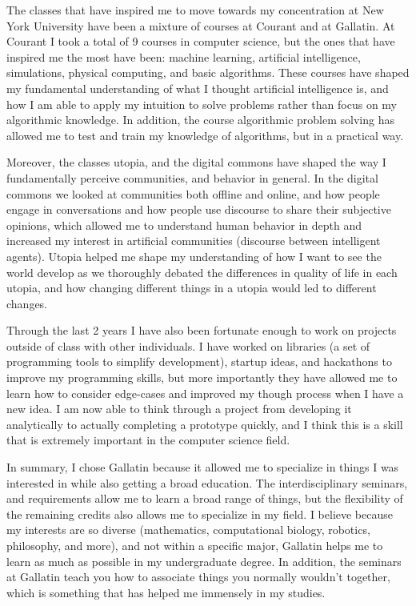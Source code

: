 \documentclass[11pt, oneside]{article}   	%
\begin{document}
\par The classes that have inspired me to move towards my concentration at New York University have been a mixture of courses at Courant and at Gallatin. At Courant I took a total of 9 courses in computer science, but the ones that have inspired me the most have been: machine learning, artificial intelligence, simulations, physical computing, and basic algorithms. These courses have shaped my fundamental understanding of what I thought artificial intelligence is, and how I am able to apply my intuition to solve problems rather than focus on my algorithmic knowledge. In addition, the course algorithmic problem solving has allowed me to test and train my knowledge of algorithms, but in a practical way.

\par Moreover, the classes utopia, and the digital commons have shaped the way I fundamentally perceive communities, and behavior in general. In the digital commons we looked at communities both offline and online, and how people engage in conversations and how people use discourse to share their subjective opinions, which allowed me to understand human behavior in depth and increased my interest in artificial communities (discourse between intelligent agents). Utopia helped me shape my understanding of how I want to see the world develop as we thoroughly debated the differences in quality of life in each utopia, and how changing different things in a utopia would led to different changes.

\par Through the last 2 years I have also been fortunate enough to work on projects outside of class with other individuals. I have worked on libraries (a set of programming tools to simplify development), startup ideas, and hackathons to improve my programming skills, but more importantly they have allowed me to learn how to consider edge-cases and improved my though process when I have a new idea. I am now able to think through a project from developing it analytically to actually completing a prototype quickly, and I think this is a skill that is extremely important in the computer science field.

\par In summary, I chose Gallatin because it allowed me to specialize in things I was interested in while also getting a broad education. The interdisciplinary seminars, and requirements allow me to learn a broad range of things, but the flexibility of the remaining credits also allows me to specialize in my field. I believe because my interests are so diverse (mathematics, computational biology, robotics, philosophy, and more), and not within a specific major, Gallatin helps me to learn as much as possible in my undergraduate degree. In addition, the seminars at Gallatin teach you how to associate things you normally wouldn't together, which is something that has helped me immensely in my studies.
\end{document}
